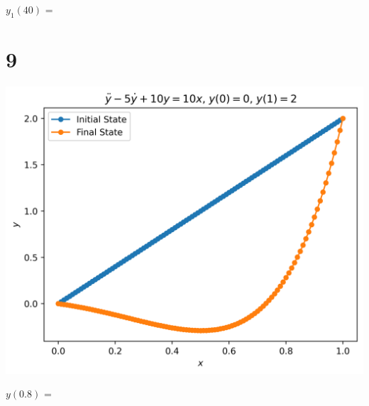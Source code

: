 \documentclass{article}
\begin{document}
$y_1(40)$ = 

\section*{9}

\begin{center}
    \includegraphics*[scale=0.8]{9.png}
\end{center}

$y(0.8)$ = 
\end{document}
